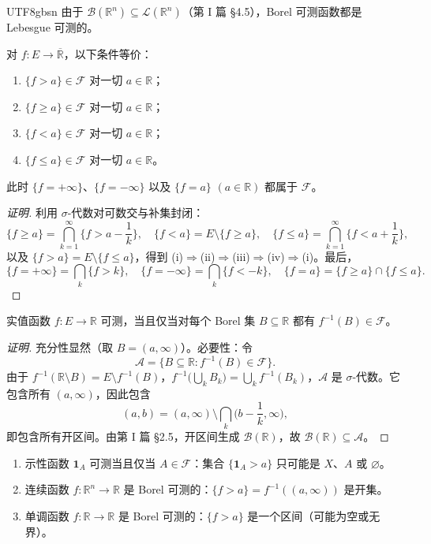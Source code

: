 \documentclass[11pt]{article}
\makeatletter
\newcommand{\envlabel}[1]{\protected@edef\@currentlabel{\themathenv}\label{#1}}
\makeatother
\begin{document}
\begin{CJK*}{UTF8}{gbsn}
由于 $\mathcal{B}(\mathbb{R}^{n})\subseteq\mathcal{L}(\mathbb{R}^{n})$（第 I 篇 \S4.5），Borel 可测函数都是 Lebesgue 可测的。

\begin{proposition}\envlabel{zh:prop:equiv}
对 $f:E\to\overline{\mathbb{R}}$，以下条件等价：
\begin{enumerate}
  \item $\{f>a\}\in\mathcal{F}$ 对一切 $a\in\mathbb{R}$；
  \item $\{f\geq a\}\in\mathcal{F}$ 对一切 $a\in\mathbb{R}$；
  \item $\{f<a\}\in\mathcal{F}$ 对一切 $a\in\mathbb{R}$；
  \item $\{f\leq a\}\in\mathcal{F}$ 对一切 $a\in\mathbb{R}$。
\end{enumerate}
此时 $\{f=+\infty\}$、$\{f=-\infty\}$ 以及 $\{f=a\}$ $(a\in\mathbb{R})$ 都属于 $\mathcal{F}$。
\end{proposition}

\begin{proof}[证明]
利用 $\sigma$-代数对可数交与补集封闭：
\[
\{f\geq a\}=\bigcap_{k=1}^{\infty}\Big\{f>a-\frac1k\Big\},\quad
\{f<a\}=E\setminus\{f\geq a\},\quad
\{f\leq a\}=\bigcap_{k=1}^{\infty}\Big\{f<a+\frac1k\Big\},
\]
以及 $\{f>a\}=E\setminus\{f\leq a\}$，得到 (i)$\Rightarrow$(ii)$\Rightarrow$(iii)$\Rightarrow$(iv)$\Rightarrow$(i)。最后，
\[
\{f=+\infty\}=\bigcap_{k}\{f>k\},\quad \{f=-\infty\}=\bigcap_{k}\{f<-k\},\quad \{f=a\}=\{f\geq a\}\cap\{f\leq a\}.
\]
\end{proof}

\begin{proposition}\envlabel{zh:prop:borel}
实值函数 $f:E\to\mathbb{R}$ 可测，当且仅当对每个 Borel 集 $B\subseteq\mathbb{R}$ 都有 $f^{-1}(B)\in\mathcal{F}$。
\end{proposition}

\begin{proof}[证明]
充分性显然（取 $B=(a,\infty)$）。必要性：令
\[
\mathcal{A}=\{B\subseteq\mathbb{R}:f^{-1}(B)\in\mathcal{F}\}.
\]
由于 $f^{-1}(\mathbb{R}\setminus B)=E\setminus f^{-1}(B)$，$f^{-1}\big(\bigcup_{k}B_{k}\big)=\bigcup_{k}f^{-1}(B_{k})$，$\mathcal{A}$ 是 $\sigma$-代数。它包含所有 $(a,\infty)$，因此包含
\[
(a,b)=(a,\infty)\setminus\bigcap_{k}\Big(b-\frac1k,\infty\Big),
\]
即包含所有开区间。由第 I 篇 \S2.5，开区间生成 $\mathcal{B}(\mathbb{R})$，故 $\mathcal{B}(\mathbb{R})\subseteq\mathcal{A}$。
\end{proof}

\begin{example}
\leavevmode
\begin{enumerate}
  \item 示性函数 $\mathbf{1}_{A}$ 可测当且仅当 $A\in\mathcal{F}$：集合 $\{\mathbf{1}_{A}>a\}$ 只可能是 $X$、$A$ 或 $\varnothing$。
  \item 连续函数 $f:\mathbb{R}^{n}\to\mathbb{R}$ 是 Borel 可测的：$\{f>a\}=f^{-1}((a,\infty))$ 是开集。
  \item 单调函数 $f:\mathbb{R}\to\mathbb{R}$ 是 Borel 可测的：$\{f>a\}$ 是一个区间（可能为空或无界）。
\end{enumerate}
\end{example}


\end{CJK*}
\end{document}
